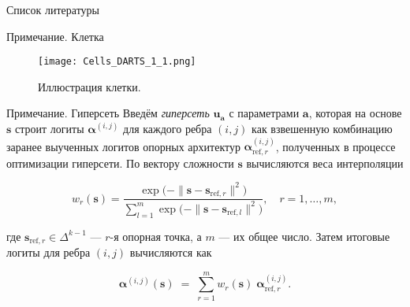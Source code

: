 \documentclass{beamer}
\begin{document}


\begin{frame}[t]{Список литературы}
  \tiny
  \nocite{*}                 %
  \printbibliography
\end{frame}


\begin{frame}{Примечание. Клетка}
    \begin{figure}
        \centering
        \texttt{[image: Cells\_DARTS\_1\_1.png]}
        \caption{Иллюстрация клетки.}
       
    \end{figure}
\end{frame}
\begin{frame}{Примечание. Гиперсеть}
     Введём \textit{гиперсеть} $\boldsymbol{u}_{\boldsymbol a}$ с параметрами $\boldsymbol a$, которая на основе $\boldsymbol{s}$ строит логиты $\boldsymbol\alpha^{(i,j)}$ для каждого ребра $(i,j)$ как взвешенную комбинацию заранее выученных логитов опорных архитектур $\boldsymbol\alpha_{\text{ref},r}^{(i,j)}$, полученных в процессе оптимизации гиперсети. По вектору сложности $\boldsymbol{s}$ вычисляются веса интерполяции

$$
  w_r(\boldsymbol{s})
  =  
  \frac{\exp\bigl(-\|\boldsymbol{s} - \boldsymbol{s}_{\text{ref},r}\|^2\bigr)}
       {\displaystyle\sum_{l=1}^{m}\exp\bigl(-\|\boldsymbol{s} - \boldsymbol{s}_{\text{ref},l}\|^2\bigr)},
  \quad
  r = 1,\dots,m,
$$

где $\boldsymbol{s}_{\text{ref},r}\in\Delta^{k-1}$ — $r$-я опорная точка, а $m$ — их общее число. Затем итоговые логиты для ребра $(i,j)$ вычисляются как

$$
  \boldsymbol\alpha^{(i,j)}(\boldsymbol{s})
  \;=\;
  \sum_{r=1}^{m} w_r(\boldsymbol{s})\;\boldsymbol\alpha_{\text{ref},r}^{(i,j)}.
$$
\end{frame}
\end{document}
